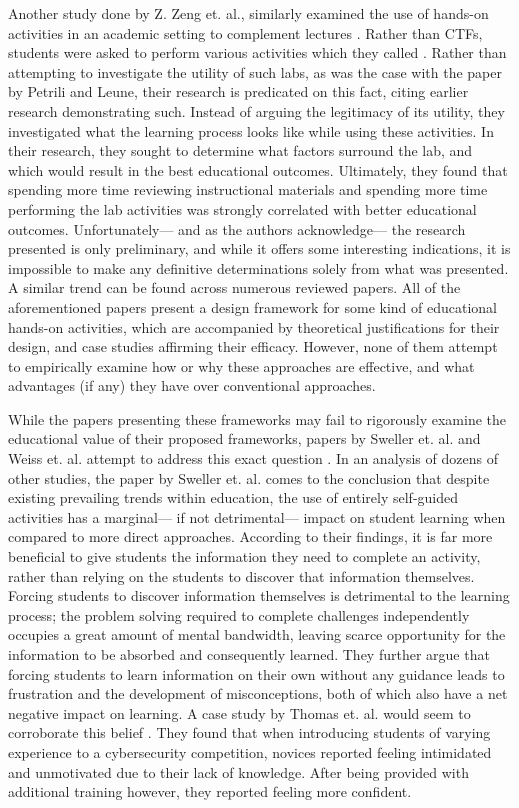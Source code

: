     Another study done by Z. Zeng et. al., similarly examined the use of hands-on activities in an academic setting to complement lectures \cite{Z-Zeng}. %
Rather than CTFs, students were asked to perform various activities which they called . %
Rather than attempting to investigate the utility of such labs, as was the case with the paper by Petrili and Leune, their research is predicated on this fact, citing earlier research demonstrating such. %
Instead of arguing the legitimacy of its utility, they investigated what the learning process looks like while using these activities. %
In their research, they sought to determine what factors surround the lab, and which would result in the best educational outcomes. %
Ultimately, they found that spending more time reviewing instructional materials and spending more time performing the lab activities was strongly correlated with better educational outcomes. %
Unfortunately---%
and as the authors acknowledge---%
the research presented is only preliminary, and while it offers some interesting indications, it is impossible to make any definitive determinations solely from what was presented. %
A similar trend can be found across numerous reviewed papers\cite{Y-Deng,W-Du,N-Eliot}. %
All of the aforementioned papers present a design framework for some kind of educational hands-on activities, which are accompanied by theoretical justifications for their design, and case studies affirming their efficacy. %
However, none of them attempt to empirically examine how or why these approaches are effective, and what advantages (if any) they have over conventional approaches. 

    While the papers presenting these frameworks may fail to rigorously examine the educational value of their proposed frameworks, papers by Sweller et. al. and Weiss et. al. attempt to address this exact question \cite{J-Sweller,R-Weiss}. %
In an analysis of dozens of other studies, the paper by Sweller et. al. comes to the conclusion that despite existing prevailing trends within education, the use of entirely self-guided activities has a marginal---%
if not detrimental---%
impact on student learning when compared to more direct approaches. %
According to their findings, it is far more beneficial to give students the information they need to complete an activity, rather than relying on the students to discover that information themselves. 
    Forcing students to discover information themselves is detrimental to the learning process; %
the problem solving required to complete challenges independently occupies a great amount of mental bandwidth, leaving scarce opportunity for the information to be absorbed and consequently learned. 
    They further argue that forcing students to learn information on their own without any guidance leads to frustration and the development of misconceptions, both of which also have a net negative impact on learning. 
    A case study by Thomas et. al. would seem to corroborate this belief \cite{L-Thomas}. %
They found that when introducing students of varying experience to a cybersecurity competition, novices reported feeling intimidated and unmotivated due to their lack of knowledge. %
After being provided with additional training however, they reported feeling more confident. 


